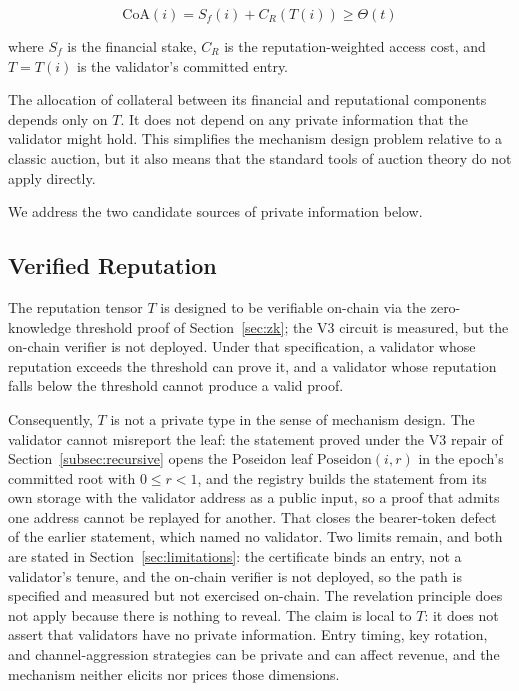 \documentclass[11pt,a4paper]{article}
\numberwithin{equation}{section}
\numberwithin{table}{section}
\begin{document}
\begin{equation}
\mathrm{CoA}(i) = S_f(i) + C_R(T(i)) \geq \Theta(t)
\label{eq:admission}
\end{equation}

where $S_f$ is the financial stake, $C_R$ is the reputation-weighted access cost, and $T = T(i)$ is the validator's committed entry.

The allocation of collateral between its financial and reputational components depends only on $T$. It does not depend on any private information that the validator might hold. This simplifies the mechanism design problem relative to a classic auction, but it also means that the standard tools of auction theory do not apply directly.

We address the two candidate sources of private information below.

\subsection{Verified Reputation}
\label{subsec:verified}
The reputation tensor $T$ is designed to be verifiable on-chain via the zero-knowledge threshold proof of Section~\ref{sec:zk}; the V3 circuit is measured, but the on-chain verifier is not deployed. Under that specification, a validator whose reputation exceeds the threshold can prove it, and a validator whose reputation falls below the threshold cannot produce a valid proof.

Consequently, $T$ is not a private type in the sense of mechanism design. The validator cannot misreport the leaf: the statement proved under the V3 repair of Section~\ref{subsec:recursive} opens the Poseidon leaf $\mathrm{Poseidon}(i,r)$ in the epoch's committed root with $0 \leq r < 1$, and the registry builds the statement from its own storage with the validator address as a public input, so a proof that admits one address cannot be replayed for another. That closes the bearer-token defect of the earlier statement, which named no validator. Two limits remain, and both are stated in Section~\ref{sec:limitations}: the certificate binds an entry, not a validator's tenure, and the on-chain verifier is not deployed, so the path is specified and measured but not exercised on-chain. The revelation principle does not apply because there is nothing to reveal. The claim is local to $T$: it does not assert that validators have no private information. Entry timing, key rotation, and channel-aggression strategies can be private and can affect revenue, and the mechanism neither elicits nor prices those dimensions.
\end{document}
